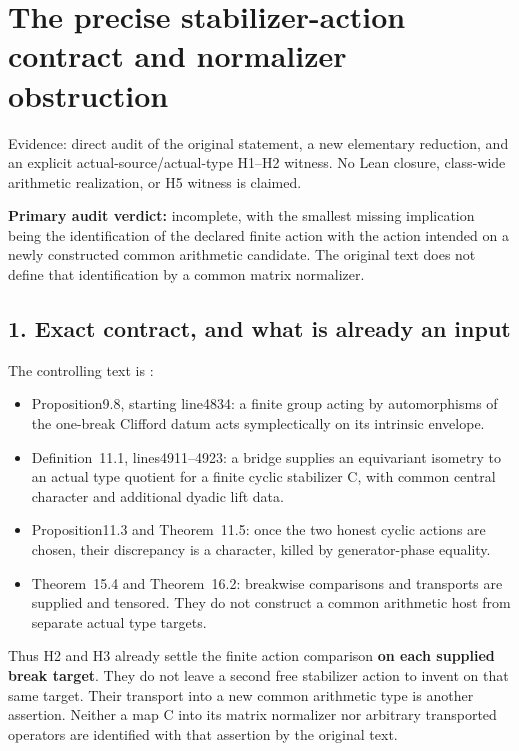 \clearpage
\section{The precise stabilizer-action contract and normalizer obstruction}\label{app:stabilizer_contract}

Evidence: direct audit of the original statement, a new elementary
reduction, and an explicit actual-source/actual-type H1--H2 witness.
No Lean closure, class-wide arithmetic
realization, or H5 witness is claimed.

\textbf{Primary audit verdict:} incomplete, with the smallest missing
implication being the identification of the declared finite action with
the action intended on a newly constructed common arithmetic candidate.
The original text does not define that identification by a common matrix
normalizer.

\hypertarget{stabilizer_contract-exact-contract-and-what-is-already-an-input}{%
\subsection{1. Exact contract, and what is already an
input}\label{stabilizer_contract-exact-contract-and-what-is-already-an-input}}

The controlling text is
:

\begin{itemize}
\tightlist
\item
  Proposition9.8, starting line4834: a finite group acting by
  automorphisms of the one-break Clifford datum acts symplectically on
  its intrinsic envelope.
\item
  Definition~11.1, lines4911--4923: a bridge supplies an equivariant
  isometry to an actual type quotient for a finite cyclic stabilizer C,
  with common central character and additional dyadic lift data.
\item
  Proposition11.3 and Theorem~11.5: once the two honest cyclic actions
  are chosen, their discrepancy is a character, killed by
  generator-phase equality.
\item
  Theorem~15.4 and Theorem~16.2: breakwise comparisons and transports are
  supplied and tensored. They do not construct a common arithmetic host
  from separate actual type targets.
\end{itemize}

Thus H2 and H3 already settle the finite action comparison \textbf{on
each supplied break target}. They do not leave a second free stabilizer
action to invent on that same target. Their transport into a new common
arithmetic type is another assertion. Neither a map C into its matrix
normalizer nor arbitrary transported operators are identified with that
assertion by the original text.

